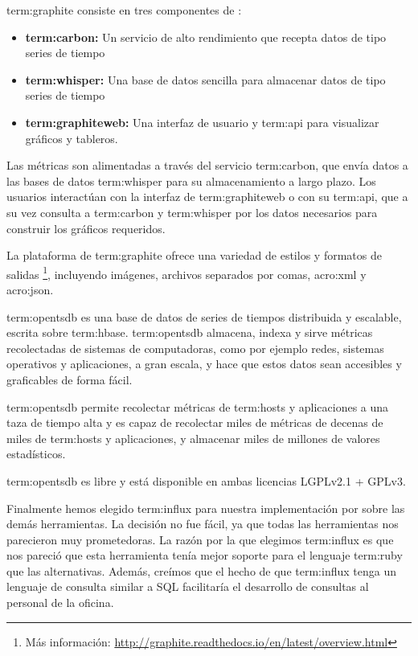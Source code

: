 \gls{term:graphite} consiste en tres componentes de :

\begin{itemize}

  \item \textbf{\gls{term:carbon}:}
  Un servicio de alto rendimiento que recepta datos de tipo series de tiempo

  \item \textbf{\gls{term:whisper}:}
  Una base de datos sencilla para almacenar datos de tipo series de tiempo

  \item \textbf{\gls{term:graphiteweb}:}
  Una interfaz de usuario y \gls{term:api} para visualizar gráficos y tableros.

\end{itemize}

Las métricas son alimentadas a través del servicio \gls{term:carbon}, que envía
datos a las bases de datos \gls{term:whisper} para su almacenamiento a largo
plazo. Los usuarios interactúan con la interfaz de \gls{term:graphiteweb} o con
su \gls{term:api}, que a su vez consulta a \gls{term:carbon} y
\gls{term:whisper} por los datos necesarios para construir los gráficos
requeridos.


La plataforma  de \gls{term:graphite} ofrece una variedad de estilos y
formatos de salidas \footnote{Más información:
\url{http://graphite.readthedocs.io/en/latest/overview.html}},
incluyendo imágenes, archivos separados por comas, \gls{acro:xml} y
\gls{acro:json}.

\gls{term:opentsdb} es una base de datos de series de tiempos distribuida y
escalable, escrita sobre \gls{term:hbase}. \gls{term:opentsdb} almacena, indexa
y sirve métricas recolectadas de sistemas de computadoras, como por ejemplo
redes, sistemas operativos y aplicaciones, a gran escala, y hace que estos
datos sean accesibles y graficables de forma fácil.

\gls{term:opentsdb} permite recolectar métricas de \glspl{term:host} y
aplicaciones a una taza de tiempo alta y es capaz de recolectar miles de
métricas de decenas de miles de \glspl{term:host} y aplicaciones, y almacenar
miles de millones de valores estadísticos.

\gls{term:opentsdb} es  libre y está disponible en ambas licencias
LGPLv2.1 + GPLv3. \cite{opentsdb}

Finalmente hemos elegido \gls{term:influx} para nuestra implementación por
sobre las demás herramientas. La decisión no fue fácil, ya que todas las
herramientas nos parecieron muy prometedoras. La razón por la que elegimos
\gls{term:influx} es que nos pareció que esta herramienta tenía mejor soporte
para el lenguaje \gls{term:ruby} que las alternativas. Además, creímos que el hecho de que
\gls{term:influx} tenga un lenguaje de consulta similar a SQL facilitaría el
desarrollo de consultas al personal de la oficina.

